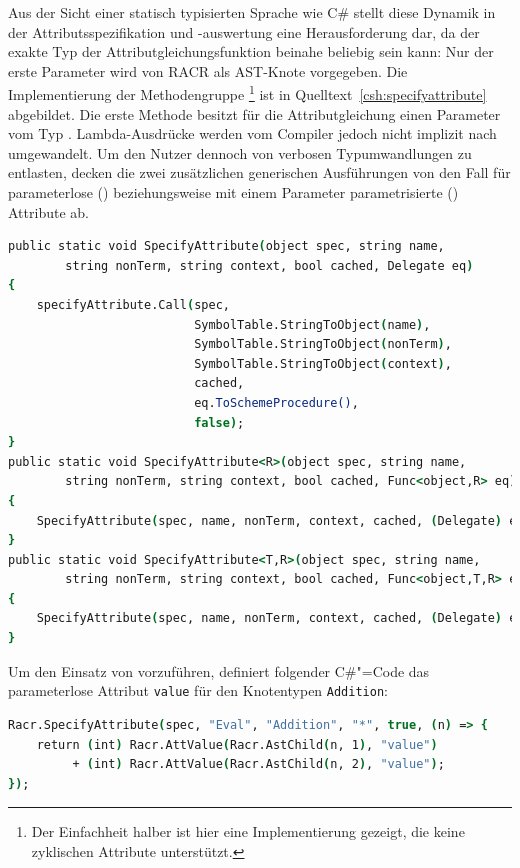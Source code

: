 Aus der Sicht einer statisch typisierten Sprache wie C\# stellt diese Dynamik in der Attributsspezifikation und -auswertung eine Herausforderung dar, da der exakte Typ der Attributgleichungsfunktion beinahe beliebig sein kann: Nur der erste Parameter wird von RACR als AST-Knote vorgegeben. Die Implementierung der Methodengruppe \footnote{Der Einfachheit halber ist hier eine Implementierung gezeigt, die keine zyklischen Attribute unterstützt.} ist in Quelltext~\ref{csh:specifyattribute} abgebildet. Die erste Methode besitzt für die Attributgleichung einen Parameter vom Typ . Lambda-Ausdrücke werden vom Compiler jedoch nicht implizit nach  umgewandelt. Um den Nutzer dennoch von verbosen Typumwandlungen zu entlasten, decken die zwei zusätzlichen generischen Ausführungen von  den Fall für parameterlose () beziehungsweise mit einem Parameter parametrisierte () Attribute ab.

\begin{lstlisting}[language=csh, caption={Methodengruppe \csh{SpecifyAttribute}}, label=csh:specifyattribute]
public static void SpecifyAttribute(object spec, string name,
		string nonTerm, string context, bool cached, Delegate eq)
{
	specifyAttribute.Call(spec,
						  SymbolTable.StringToObject(name),
						  SymbolTable.StringToObject(nonTerm),
						  SymbolTable.StringToObject(context),
						  cached,
						  eq.ToSchemeProcedure(),
						  false);
}
public static void SpecifyAttribute<R>(object spec, string name,
		string nonTerm, string context, bool cached, Func<object,R> eq)
{
	SpecifyAttribute(spec, name, nonTerm, context, cached, (Delegate) eq);
}
public static void SpecifyAttribute<T,R>(object spec, string name,
		string nonTerm,	string context, bool cached, Func<object,T,R> eq)
{
	SpecifyAttribute(spec, name, nonTerm, context, cached, (Delegate) eq);
}
\end{lstlisting}

Um den Einsatz von  vorzuführen, definiert folgender C\#"=Code das parameterlose Attribut \verb|value| für den Knotentypen \verb|Addition|:

\begin{lstlisting}[language=csh]
Racr.SpecifyAttribute(spec, "Eval", "Addition", "*", true, (n) => {
	return (int) Racr.AttValue(Racr.AstChild(n, 1), "value")
		 + (int) Racr.AttValue(Racr.AstChild(n, 2), "value");
});
\end{lstlisting}

